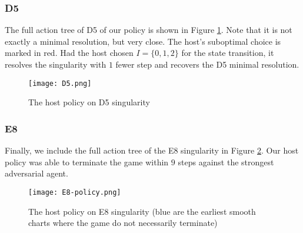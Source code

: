 \documentclass{article}
\theoremstyle{plain}
\theoremstyle{definition}
\theoremstyle{remark}
\begin{document}
\subsubsection{D5}
The full action tree of D5 of our policy is shown in Figure \ref{d5-host}. Note that it is not exactly a minimal resolution, but very close. The host's suboptimal choice is marked in red. Had the host chosen $I=\{0,1,2\}$ for the state transition, it resolves the singularity with $1$ fewer step and recovers the D5 minimal resolution.
\begin{figure*}[ht!]
\centering
\texttt{[image: D5.png]}
\caption{The host policy on D5 singularity} \label{d5-host}
\end{figure*}


\subsubsection{E8}
Finally, we include the full action tree of the E8 singularity in Figure \ref{e8-host}. Our host policy was able to terminate the game within $9$ steps against the strongest adversarial agent.
\begin{figure*}[ht!]
\centering
\texttt{[image: E8-policy.png]}
\caption{The host policy on E8 singularity (blue are the earliest smooth charts where the game do not necessarily terminate)} \label{e8-host}
\end{figure*}
\end{document}
